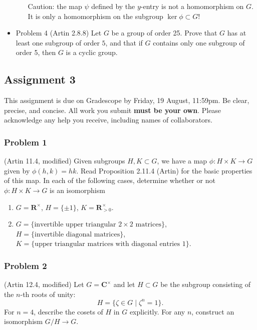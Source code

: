 \documentclass[11pt]{article}
\begin{document}
\begin{itemize}
\begin{itemize}
Caution: the map \(\psi\) defined by the \(y\)-entry is not a homomorphism on \(G\).
It is only a homomorphism on the subgroup \(\ker \phi \subset G\)!
\end{itemize}

\item Problem 4
\label{sec:orgc2f8d74}
(Artin 2.8.8)
Let \(G\) be a group of order 25. 
Prove that \(G\) has at least one subgroup of order \(5\), and that if \(G\) contains only one subgroup of order 5, then \(G\) is a cyclic group.
\end{itemize}

\subsection*{Assignment 3}
\label{sec:orgf8f4b6f}
This assignment is due on Gradescope by Friday, 19 August, 11:59pm.
Be clear, precise, and concise.  All work you submit \textbf{must be your own}.  Please acknowledge any help you receive, including names of collaborators.

\subsubsection*{Problem 1}
\label{sec:org6056655}
(Artin 11.4, modified)
 Given subgroups \(H, K \subset G\), we have a map  \(\phi \colon H \times K \to G\)
 given by \(\phi(h,k) = hk\). Read Proposition 2.11.4 (Artin) for the basic properties of this map.
 In each of the following cases, determine whether or not \(\phi \colon H \times K \to G\) is an isomorphism
\begin{enumerate}
\item \(G = \mathbf{R}^{\times}\), \(H = \{\pm 1\}\), \(K = \mathbf{R}_{>0}^{\times}\).
\item \(G = \{\text{invertible upper triangular $2 \times 2$ matrices}\}\), \(H = \{\text{invertible diagonal matrices}\}\),\newline \(K = \{\text{upper triangular matrices with diagonal entries 1}\}\).
\end{enumerate}

\subsubsection*{Problem 2}
\label{sec:orgdb38a58}
(Artin 12.4, modified)
   Let \(G = \mathbf{C}^{\times}\) and let \(H \subset G\) be the subgroup consisting of the \(n\)-th roots of unity:
   \[ H = \{\zeta \in G \mid \zeta^{n} = 1\}.\]
   For \(n = 4\), describe the cosets of \(H\) in \(G\) explicitly.
   For any \(n\), construct an isomorphism \(G/H \to G\).
\end{document}
